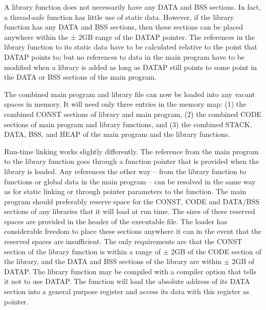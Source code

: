 \documentclass[forwardcom.tex]{subfiles}
\begin{document}
A library function does not necessarily have any DATA and BSS sections. In fact, a thread-safe function has little use of static data. However, if the library function has any DATA and BSS sections, then these sections can be placed anywhere within the ± 2GB range of the DATAP pointer. The references in the library function to its static data have to be calculated relative to the point that DATAP points to; but no references to data in the main program have to be modified when a library is added as long as DATAP still points to some point in the DATA or BSS sections of the main program. 
\vspace{2mm}

The combined main program and library file can now be loaded into any vacant spaces in memory. It will need only three entries in the memory map: (1) the combined CONST sections of library and main program, (2) the combined CODE sections of main program and library functions, and (3) the combined STACK, DATA, BSS, and HEAP of the main program and the library functions. 
\vspace{2mm}

Run-time linking works slightly differently. The reference from the main program to the library function goes through a function pointer that is provided when the library is loaded. Any references the other way -- from the library function to functions or global data in the main 
program -- can be resolved in the same way as for static linking or through pointer parameters to the function. The main program should preferably reserve space for the CONST, CODE and DATA/BSS sections of any libraries that it will load at run time. The sizes of these reserved spaces are provided in the header of the executable file. The loader has considerable freedom to place these sections anywhere it can in the event that the reserved spaces are insufficient. The only requirements are that the CONST section of the library function is within a range of $\pm$ 2GB of the CODE section of the library, and the DATA and BSS sections of the library are within $\pm$ 2GB of DATAP. The library function may be compiled with a compiler option that tells it not to use DATAP. The function will load the absolute address of its DATA section into a general purpose register and access its data with this register as pointer. 
\vspace{2mm}
\end{document}
